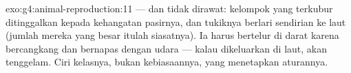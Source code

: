 \begin{solution}{exo:g4:animal-reproduction:11}
 --- dan tidak dirawat: kelompok  yang terkubur ditinggalkan
kepada kehangatan pasirnya, dan tukiknya berlari sendirian ke laut
(jumlah mereka yang besar itulah siasatnya). Ia harus bertelur di
darat karena   bercangkang dan bernapas dengan udara ---
kalau dikeluarkan di laut,  akan tenggelam. Ciri kelasnya,
bukan kebiasaannya, yang menetapkan aturannya.
\end{solution}
